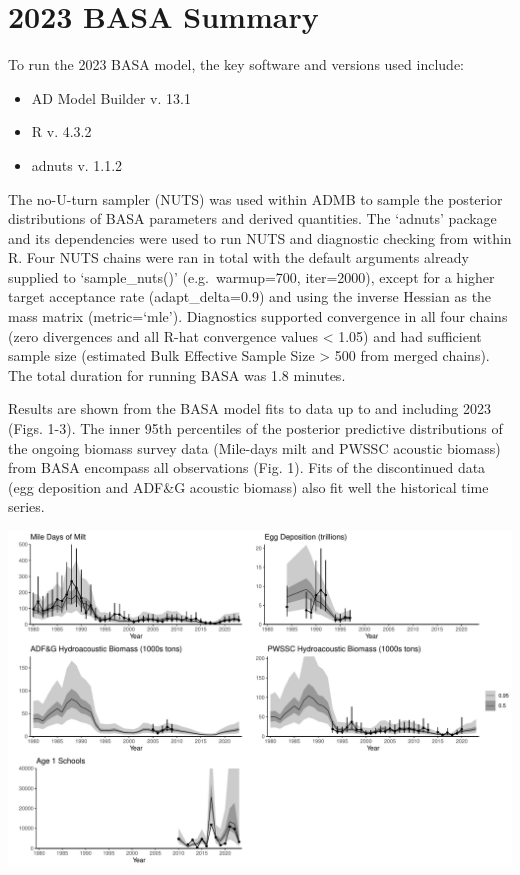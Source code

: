 \documentclass[
  11pt,
]{article}
\providecommand{\tightlist}{%
  \setlength{\itemsep}{0pt}\setlength{\parskip}{0pt}}
\begin{document}
\section{2023 BASA Summary}\label{basa-summary}

To run the 2023 BASA model, the key software and versions used include:

\begin{itemize}
\tightlist
\item
  AD Model Builder v. 13.1
\item
  R v. 4.3.2
\item
  adnuts v. 1.1.2
\end{itemize}

The no-U-turn sampler (NUTS) was used within ADMB to sample the
posterior distributions of BASA parameters and derived quantities. The
`adnuts' package and its dependencies were used to run NUTS and
diagnostic checking from within R. Four NUTS chains were ran in total
with the default arguments already supplied to `sample\_nuts()'
(e.g.~warmup=700, iter=2000), except for a higher target acceptance rate
(adapt\_delta=0.9) and using the inverse Hessian as the mass matrix
(metric=`mle'). Diagnostics supported convergence in all four chains
(zero divergences and all R-hat convergence values \textless{} 1.05) and
had sufficient sample size (estimated Bulk Effective Sample Size
\textgreater{} 500 from merged chains). The total duration for running
BASA was 1.8 minutes.

Results are shown from the BASA model fits to data up to and including
2023 (Figs. 1-3). The inner 95th percentiles of the posterior predictive
distributions of the ongoing biomass survey data (Mile-days milt and
PWSSC acoustic biomass) from BASA encompass all observations (Fig. 1).
Fits of the discontinued data (egg deposition and ADF\&G acoustic
biomass) also fit well the historical time series.

\begin{center}\includegraphics[width=0.85\linewidth]{figures/survey_fits} \end{center}
\end{document}
